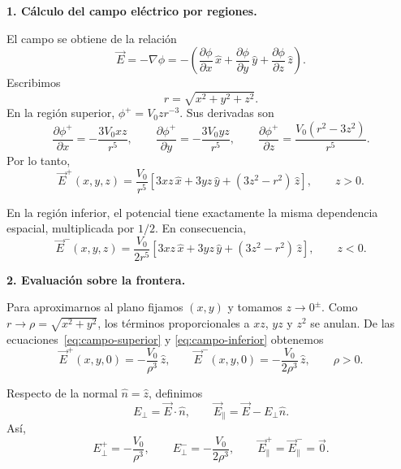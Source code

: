 \documentclass[11pt]{article}
\begin{document}
\textbf{1. Cálculo del campo eléctrico por regiones.}\par
El campo se obtiene de la relación
\begin{equation}
\vec E=-\nabla\phi
=-\left(
\frac{\partial\phi}{\partial x}\,\hat x
+\frac{\partial\phi}{\partial y}\,\hat y
+\frac{\partial\phi}{\partial z}\,\hat z
\right).
\label{eq:campo-gradiente}
\end{equation}
Escribimos
\[
r=\sqrt{x^2+y^2+z^2}.
\]
En la región superior, $\phi^+=V_0zr^{-3}$. Sus derivadas son
\begin{equation*}
\frac{\partial\phi^+}{\partial x}=-\frac{3V_0xz}{r^5},
\qquad
\frac{\partial\phi^+}{\partial y}=-\frac{3V_0yz}{r^5},
\qquad
\frac{\partial\phi^+}{\partial z}
=\frac{V_0(r^2-3z^2)}{r^5}.
\end{equation*}
Por lo tanto,
\begin{equation}
\boxed{
\vec E^{+}(x,y,z)=\frac{V_0}{r^5}
\left[3xz\,\hat x+3yz\,\hat y+(3z^2-r^2)\,\hat z\right],
\qquad z>0.}
\label{eq:campo-superior}
\end{equation}

En la región inferior, el potencial tiene exactamente la misma dependencia
espacial, multiplicada por $1/2$. En consecuencia,
\begin{equation}
\boxed{
\vec E^{-}(x,y,z)=\frac{V_0}{2r^5}
\left[3xz\,\hat x+3yz\,\hat y+(3z^2-r^2)\,\hat z\right],
\qquad z<0.}
\label{eq:campo-inferior}
\end{equation}

\textbf{2. Evaluación sobre la frontera.}\par
Para aproximarnos al plano fijamos $(x,y)$ y tomamos $z\to0^\pm$. Como
$r\to\rho=\sqrt{x^2+y^2}$, los términos proporcionales a $xz$, $yz$ y $z^2$
se anulan. De las ecuaciones~\eqref{eq:campo-superior} y
\eqref{eq:campo-inferior} obtenemos
\begin{equation}
\boxed{
\vec E^{+}(x,y,0)=-\frac{V_0}{\rho^3}\,\hat z,
\qquad
\vec E^{-}(x,y,0)=-\frac{V_0}{2\rho^3}\,\hat z,}
\qquad \rho>0.
\label{eq:campos-frontera}
\end{equation}

Respecto de la normal $\hat n=\hat z$, definimos
\[
E_\perp=\vec E\cdot\hat n,
\qquad
\vec E_\parallel=\vec E-E_\perp\hat n.
\]
Así,
\begin{equation}
E^+_\perp=-\frac{V_0}{\rho^3},
\qquad
E^-_\perp=-\frac{V_0}{2\rho^3},
\qquad
\vec E^+_\parallel=\vec E^-_\parallel=\vec 0.
\label{eq:componentes-frontera}
\end{equation}
\end{document}
